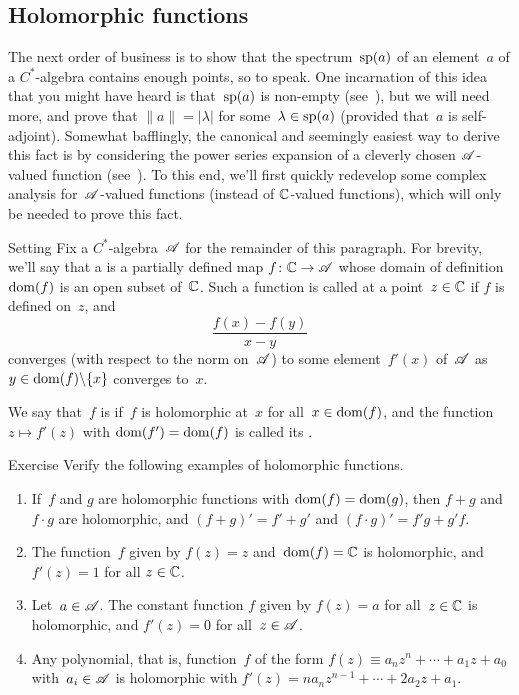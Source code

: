 \documentclass[a]{subfiles}
\begin{document}
\subsection{Holomorphic functions}
\begin{parsec}%
\begin{point}%
The next order of business
is to show that the spectrum~$\mathrm{sp}(a)$ of an element~$a$
of a $C^*$-algebra contains enough points, so to speak.
One incarnation of this idea that you might have heard
is that~$\mathrm{sp}(a)$ is non-empty
(see~), but
we will need more,
and prove that  $\|a\|=\left|\lambda\right|$
for some~$\lambda\in\mathrm{sp}(a)$
(provided that~$a$ is self-adjoint).
Somewhat bafflingly,
the canonical and seemingly
easiest way to derive this fact is by considering the power series
expansion of a cleverly chosen $\mathscr{A}$-valued function
(see~).
To this end,
we'll first quickly redevelop some complex analysis
for~$\mathscr{A}$-valued functions
(instead of $\mathbb{C}$-valued functions),
which will only be needed to prove this fact.
\end{point}
\begin{point}{Setting}%
Fix a $C^*$-algebra~$\mathscr{A}$ for the remainder of this paragraph.
For brevity,
we'll say that a 
is a partially defined map $f\colon \mathbb{C}\to \mathscr{A}$
whose domain of definition $\operatorname{dom}(f)$ is an open subset of~$\mathbb{C}$.
Such a function is called  at a point~$z\in \mathbb{C}$
if $f$ is defined on~$z$,
and 
\begin{equation*}
\frac{f(x)-f(y)}{x-y}
\end{equation*}
converges (with respect to the norm on~$\mathscr{A}$)
to some element~$f'(x)$ of~$\mathscr{A}$
as $y\in \operatorname{dom}(f)\backslash\{x\}$
converges to~$x$.

We say that~$f$ is 
if~$f$ is holomorphic at~$x$ for all~$x\in \operatorname{dom}(f)$,
and the function $z\mapsto f'(z)$
with $\operatorname{dom}(f')=\operatorname{dom}(f)$
is called its .
\end{point}
\begin{point}{Exercise}%
Verify the following examples of holomorphic functions.
\begin{enumerate}
\item
If~$f$ and $g$ are holomorphic functions with $\operatorname{dom}(f)=\operatorname{dom}(g)$,
then $f+g$ and $f\cdot g$ are holomorphic,
and $(f+g)'=f'+g'$ and $(f\cdot g)' = f'g+g'f$.

\item
The function~$f$ given by $f(z)=z$ and~$\operatorname{dom}(f)=\mathbb{C}$
is holomorphic, and $f'(z)=1$ for all $z\in\mathbb{C}$.

\item
Let~$a\in \mathscr{A}$. The constant function $f$ given by $f(z)=a$
for all~$z\in \mathbb{C}$ is holomorphic, and $f'(z)=0$ for all~$z\in \mathscr{A}$.

\item
Any polynomial,
that is, function~$f$ of the form $f(z)\equiv a_n z^n+\dotsb+a_1 z+a_0$
with~$a_i\in \mathscr{A}$
is holomorphic with $f'(z)=na_nz^{n-1}+\dotsb+2a_2z+a_1$.
\end{enumerate}
\end{point}
\end{parsec}
\end{document}
